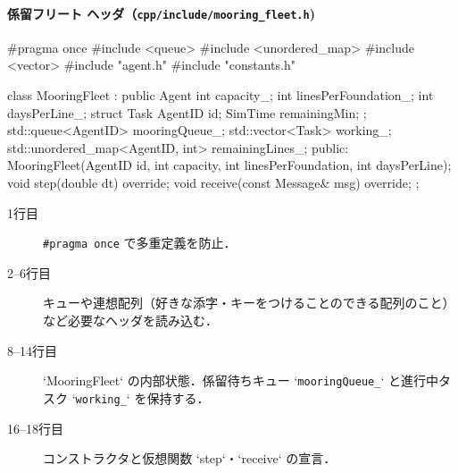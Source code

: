 \documentclass[10pt,letterpaper]{jsarticle}
\begin{document}
\paragraph{係留フリート ヘッダ（\texttt{cpp/include/mooring\_fleet.h})}
\begin{cppcode}
#pragma once
#include <queue>
#include <unordered_map>
#include <vector>
#include "agent.h"
#include "constants.h"

class MooringFleet : public Agent {
    int capacity_;
    int linesPerFoundation_;
    int daysPerLine_;
    struct Task { AgentID id; SimTime remainingMin; };
    std::queue<AgentID> mooringQueue_;
    std::vector<Task> working_;
    std::unordered_map<AgentID, int> remainingLines_;
public:
    MooringFleet(AgentID id, int capacity, int linesPerFoundation, int daysPerLine);
    void step(double dt) override;
    void receive(const Message& msg) override;
};
\end{cppcode}
\begin{description}
  \item[1行目] \lstinline|#pragma once| で多重定義を防止．
  \item[2--6行目] キューや連想配列（好きな添字・キーをつけることのできる配列のこと）など必要なヘッダを読み込む．
  \item[8--14行目] `MooringFleet` の内部状態．係留待ちキュー `\texttt{mooringQueue\_}` と進行中タスク `\texttt{working\_}` を保持する．
  \item[16--18行目] コンストラクタと仮想関数 `step`・`receive` の宣言．
\end{description}
\end{document}
